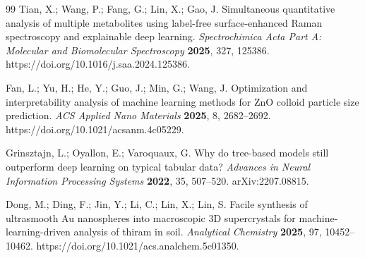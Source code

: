 \documentclass[preprint,12pt]{elsarticle}
\begin{document}
{\begin{thebibliography}{99}
 Tian, X.; Wang, P.; Fang, G.; Lin, X.; Gao, J. Simultaneous quantitative analysis of multiple metabolites using label-free surface-enhanced Raman spectroscopy and explainable deep learning. \textit{Spectrochimica Acta Part A: Molecular and Biomolecular Spectroscopy} \textbf{2025}, 327, 125386. https://doi.org/10.1016/j.saa.2024.125386.

 Fan, L.; Yu, H.; He, Y.; Guo, J.; Min, G.; Wang, J. Optimization and interpretability analysis of machine learning methods for ZnO colloid particle size prediction. \textit{ACS Applied Nano Materials} \textbf{2025}, 8, 2682--2692. https://doi.org/10.1021/acsanm.4c05229.

 Grinsztajn, L.; Oyallon, E.; Varoquaux, G. Why do tree-based models still outperform deep learning on typical tabular data? \textit{Advances in Neural Information Processing Systems} \textbf{2022}, 35, 507--520. arXiv:2207.08815.

 Dong, M.; Ding, F.; Jin, Y.; Li, C.; Lin, X.; Lin, S. Facile synthesis of ultrasmooth Au nanospheres into macroscopic 3D supercrystals for machine-learning-driven analysis of thiram in soil. \textit{Analytical Chemistry} \textbf{2025}, 97, 10452--10462. https://doi.org/10.1021/acs.analchem.5c01350.

\end{thebibliography}
}
\end{document}
